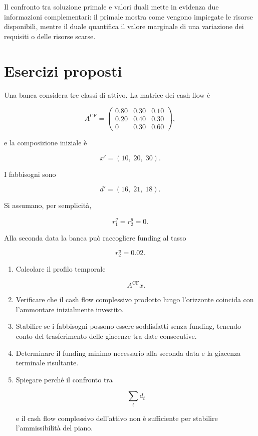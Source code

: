 Il confronto tra soluzione primale e valori duali mette in evidenza due
informazioni complementari: il primale mostra come vengono impiegate le
risorse disponibili, mentre il duale quantifica il valore marginale di una
variazione dei requisiti o delle risorse scarse.

\section{Esercizi proposti}

\label{sec:cap12-esercizi-proposti}


\begin{exercise}

\label{ex:cap12-proposto-cashflow-temporali}

Una banca considera tre classi di attivo. La matrice dei cash flow \`e

\[
A^{\mathrm{CF}}
=
\begin{pmatrix}
0.80 & 0.30 & 0.10\\
0.20 & 0.40 & 0.30\\
0    & 0.30 & 0.60
\end{pmatrix},
\]

e la composizione iniziale \`e

\[
x'
=
(10,\;20,\;30).
\]

I fabbisogni sono

\[
d'
=
(16,\;21,\;18).
\]

Si assumano, per semplicit\`a,

\[
r_1^{g}=r_2^{g}=0.
\]

Alla seconda data la banca pu\`o raccogliere funding al tasso

\[
r_2^{u}=0.02.
\]

\begin{enumerate}

\item Calcolare il profilo temporale

\[
A^{\mathrm{CF}}x.
\]

\item Verificare che il cash flow complessivo prodotto lungo l'orizzonte
coincida con l'ammontare inizialmente investito.

\item Stabilire se i fabbisogni possono essere soddisfatti senza funding,
tenendo conto del trasferimento delle giacenze tra date consecutive.

\item Determinare il funding minimo necessario alla seconda data e la
giacenza terminale risultante.

\item Spiegare perch\'e il confronto tra

\[
\sum_t d_t
\]

e il cash flow complessivo dell'attivo non \`e sufficiente per stabilire
l'ammissibilit\`a del piano.

\end{enumerate}

\end{exercise}


